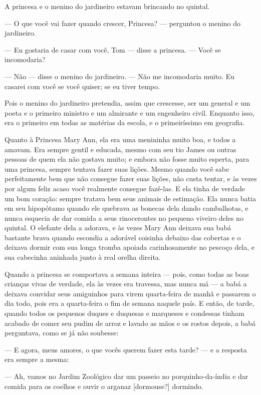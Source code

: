 A princesa e o menino do jardineiro estavam brincando no quintal.

— O que você vai fazer quando crescer, Princesa? — perguntou o menino
do jardineiro.

— Eu gostaria de casar com você, Tom — disse a princesa. — Você se
incomodaria?

— Não — disse o menino do jardineiro. — Não me incomodaria muito. Eu
casarei com você se você quiser; se eu tiver tempo.

Pois o menino do jardineiro pretendia, assim que crescesse, ser um
general e um poeta e o primeiro ministro e um almirante e um
engenheiro civil. Enquanto isso, era o primeiro em todas as matérias
da escola, e o primeiríssimo em geografia.

Quanto à Princesa Mary Ann, ela era uma menininha muito boa, e todos a
amavam. Era sempre gentil e educada, mesmo com seu tio James ou
outras pessoas de quem ela não gostava muito; e embora não fosse
muito esperta, para uma princesa, sempre tentava fazer suas lições.
Mesmo quando você sabe perfeitamente bem que não consegue fazer suas
lições, não custa tentar, e às vezes por algum feliz acaso você
realmente consegue fazê-las. E ela tinha de verdade um bom coração:
sempre tratava bem seus animais de estimação. Ela nunca batia em seu
hipopótamo quando ele quebrava as bonecas dela dando cambalhotas, e
nunca esquecia de dar comida a seus rinocerontes no pequeno viveiro
deles no quintal. O elefante dela a adorava, e às vezes Mary Ann
deixava sua babá bastante brava quando escondia a adorável coisinha
debaixo das cobertas e o deixava dormir com sua longa tromba apoiada
carinhosamente no pescoço dela, e sua cabecinha aninhada junto à real
orelha direita. 

Quando a princesa se comportava a semana inteira — pois, como todas as
boas crianças vivas de verdade, ela às vezes era travessa, mas nunca
má — a babá a deixava convidar seus amiguinhos para virem
quarta-feira de manhã e passarem o dia todo, pois era a quarta-feira
o fim de semana naquele país. E então, de tarde, quando todos os
pequenos duques e duquesas e marqueses e condessas tinham acabado de
comer seu pudim de arroz e lavado as mãos e os rostos depois, a babá
perguntava, como se já não soubesse:

— E agora, meus amores, o que vocês querem fazer esta tarde? — e a
resposta era sempre a mesma:

— Ah, vamos no Jardim Zoológico dar um passeio no porquinho-da-índia e
dar comida para os coelhos e ouvir o arganaz [dormouse?] dormindo.

